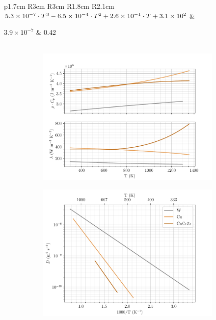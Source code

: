 \begin{table}[ht]
\begin{tabular}{p{1.7cm}  R{3cm}  R{3cm}  R{1.8cm}  R{2.1cm} }
        $5.3\times 10^{-7}\cdot T^3\newline %
        -6.5\times 10^{-4}\cdot T^2\newline %
        +2.6\times 10^{-1}\cdot T\newline %
        +3.1\times 10^2$ & %

        $3.9\times 10^{-7}$ & %
        0.42\\
        \\
    \end{tabular}
    \caption{Materials properties used in the simulations. Thermal properties are fitted from ANSYS. \cite{reiter_compilation_1996, serra_hydrogen_1998, fernandez_hydrogen_2015}}
    \label{tab:materials properties_2}
\end{table}

\begin{figure} [h!]
    \centering
    \begin{subfigure}{0.5\linewidth}
        \centering
        \includegraphics[width=\linewidth]{Figures/Chapter3/monoblocks/parametric_study/thermal_prop.pdf}
    \end{subfigure}%
    \begin{subfigure}{0.5\linewidth}
        \centering
        \includegraphics[width=\linewidth]{Figures/Chapter3/monoblocks/parametric_study/D_coeff.pdf}

\end{subfigure}
\end{figure}
